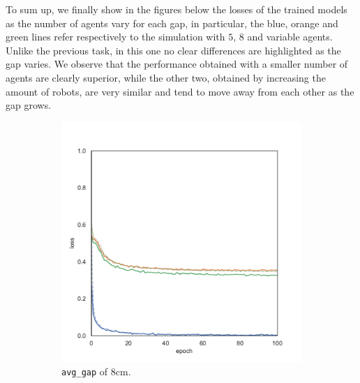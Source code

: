 To sum up, we finally show in the figures below the losses of the trained models as 
the number of agents vary for each gap, in particular, the blue, orange and green 
lines refer respectively to the simulation with $5$, $8$ and variable agents. 
Unlike the previous task, in this one no clear differences are highlighted as the 
gap varies. 
We observe that the performance obtained with a smaller number of agents are 
clearly superior, while the other two, obtained by increasing the amount of 
robots, are very similar and tend to move away from each other as the gap 
grows.
\begin{figure}[!htb]
	\begin{center}
		\begin{subfigure}[h]{0.32\textwidth}
			\includegraphics[width=\textwidth]{contents/images/task2/loss-communication-gap_8}%
			\caption{\texttt{avg\_gap} of $8$\gls{cm}.}
		\end{subfigure}
		\hfill
		\begin{subfigure}[h]{0.32\textwidth}

\end{subfigure}
\end{center}
\end{figure}
